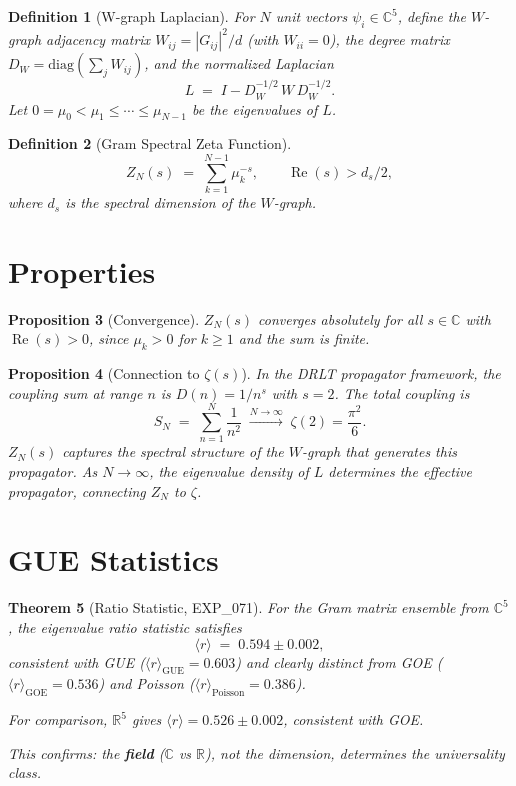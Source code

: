 \documentclass[11pt]{article}
\newtheorem{theorem}{Theorem}
\newtheorem{definition}[theorem]{Definition}
\newtheorem{proposition}[theorem]{Proposition}
\begin{document}
\begin{definition}[W-graph Laplacian]
For $N$ unit vectors $\psi_i \in \mathbb{C}^5$, define
the $W$-graph adjacency matrix $W_{ij} = |G_{ij}|^2/d$ (with $W_{ii} = 0$),
the degree matrix $D_W = \mathrm{diag}(\sum_j W_{ij})$,
and the normalized Laplacian
\[
  L \;=\; I - D_W^{-1/2} \, W \, D_W^{-1/2}.
\]
Let $0 = \mu_0 < \mu_1 \leq \cdots \leq \mu_{N-1}$
be the eigenvalues of $L$.
\end{definition}

\begin{definition}[Gram Spectral Zeta Function]
\[
  Z_N(s) \;=\; \sum_{k=1}^{N-1} \mu_k^{-s},
  \qquad \operatorname{Re}(s) > d_s/2,
\]
where $d_s$ is the spectral dimension of the $W$-graph.
\end{definition}

\section{Properties}

\begin{proposition}[Convergence]
$Z_N(s)$ converges absolutely for all $s \in \mathbb{C}$
with $\operatorname{Re}(s) > 0$, since $\mu_k > 0$ for $k \geq 1$
and the sum is finite.
\end{proposition}

\begin{proposition}[Connection to $\zeta(s)$]
In the DRLT propagator framework, the coupling sum at range $n$ is
$D(n) = 1/n^s$ with $s = 2$.  The total coupling is
\[
  S_N \;=\; \sum_{n=1}^{N} \frac{1}{n^2}
  \;\xrightarrow{N \to \infty}\; \zeta(2) = \frac{\pi^2}{6}.
\]
$Z_N(s)$ captures the spectral structure of the $W$-graph
that generates this propagator. As $N \to \infty$,
the eigenvalue density of $L$ determines the effective
propagator, connecting $Z_N$ to $\zeta$.
\end{proposition}

\section{GUE Statistics}

\begin{theorem}[Ratio Statistic, EXP\_071]
For the Gram matrix ensemble from $\mathbb{C}^5$,
the eigenvalue ratio statistic satisfies
\[
  \langle r \rangle \;=\; 0.594 \pm 0.002,
\]
consistent with GUE ($\langle r \rangle_{\mathrm{GUE}} = 0.603$)
and clearly distinct from GOE ($\langle r \rangle_{\mathrm{GOE}} = 0.536$)
and Poisson ($\langle r \rangle_{\mathrm{Poisson}} = 0.386$).

For comparison, $\mathbb{R}^5$ gives
$\langle r \rangle = 0.526 \pm 0.002$,
consistent with GOE.

This confirms: the \textbf{field} ($\mathbb{C}$ vs $\mathbb{R}$),
not the dimension, determines the universality class.
\end{theorem}
\end{document}
